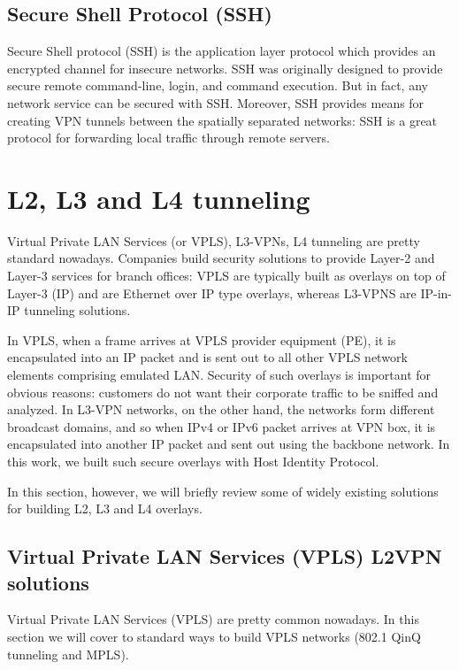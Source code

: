 \subsection{Secure Shell Protocol (SSH)}

Secure Shell protocol (SSH) is the application layer protocol which provides an encrypted channel 
for insecure networks. SSH was originally designed to provide secure remote command-line, login, 
and command execution. But in fact, any network service can be secured with SSH. Moreover, SSH 
provides means for creating VPN tunnels between the spatially separated networks: SSH is a great 
protocol for forwarding local traffic through remote servers. 

\section{L2, L3 and L4 tunneling}

Virtual Private LAN Services (or VPLS), L3-VPNs, L4 tunneling are pretty standard nowadays. 
Companies build security solutions to provide Layer-2 and Layer-3 services for branch offices: 
VPLS are typically built as overlays on top of Layer-3 (IP) and are Ethernet over IP type 
overlays, whereas L3-VPNS are IP-in-IP tunneling solutions.

In VPLS, when a frame arrives at VPLS provider equipment (PE), it is encapsulated 
into an IP packet and is sent out to all other VPLS network elements comprising emulated LAN. 
Security of such overlays is important for obvious reasons: customers do not want their corporate 
traffic to be sniffed and analyzed. In L3-VPN networks, on the other hand, the networks form different 
broadcast domains, and so when IPv4 or IPv6 packet arrives at VPN box, it is encapsulated into another 
IP packet and sent out using the backbone network. In this work, we built such secure overlays with 
Host Identity Protocol. 

In this section, however, we will briefly review some of widely existing solutions 
for building L2, L3 and L4 overlays.

\subsection{Virtual Private LAN Services (VPLS) L2VPN solutions}

Virtual Private LAN Services (VPLS) are pretty common nowadays. In this section we will cover 
to standard ways to build VPLS networks (802.1 QinQ tunneling and MPLS).

